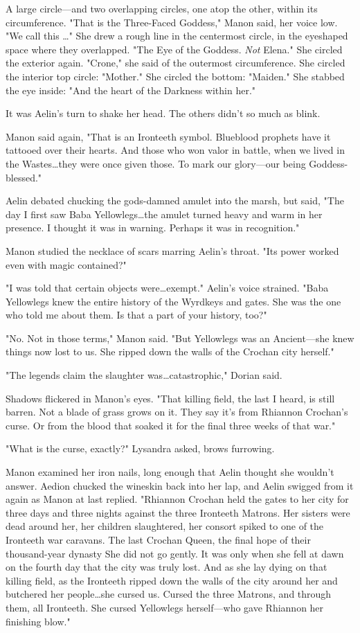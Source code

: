 A large circle---and two overlapping circles, one atop the other, within its circumference.
"That is the Three-Faced Goddess," Manon said, her voice low.
"We call this \ldots" She drew a rough line in the centermost circle, in the eyeshaped space where they overlapped.
"The Eye of the Goddess.
\emph{Not} Elena."
She circled the exterior again.
"Crone," she said of the outermost circumference.
She circled the interior top circle: "Mother."
She circled the bottom: "Maiden."
She stabbed the eye inside: "And the heart of the Darkness within her."

It was Aelin's turn to shake her head.
The others didn't so much as blink.

Manon said again, "That is an Ironteeth symbol.
Blueblood prophets have it tattooed over their hearts.
And those who won valor in battle, when we lived in the Wastes\ldots they were once given those.
To mark our glory---our being Goddess-blessed."

Aelin debated chucking the gods-damned amulet into the marsh, but said, "The day I first saw Baba Yellowlegs\ldots the amulet turned heavy and warm in her presence.
I thought it was in warning.
Perhaps it was in  recognition."

Manon studied the necklace of scars marring Aelin's throat.
"Its power worked even with magic contained?"

"I was told that certain objects were\ldots exempt."
Aelin's voice strained.
"Baba Yellowlegs knew the entire history of the Wyrdkeys and gates.
She was the one who told me about them.
Is that a part of your history, too?"

"No.
Not in those terms," Manon said.
"But Yellowlegs was an Ancient---she knew things now lost to us.
She ripped down the walls of the Crochan city herself."

"The legends claim the slaughter was\ldots catastrophic," Dorian said.

Shadows flickered in Manon's eyes.
"That killing field, the last I heard, is still barren.
Not a blade of grass grows on it.
They say it's from Rhiannon Crochan's curse.
Or from the blood that soaked it for the final three weeks of that war."

"What is the curse, exactly?"
Lysandra asked, brows furrowing.

Manon examined her iron nails, long enough that Aelin thought she wouldn't answer.
Aedion chucked the wineskin back into her lap, and Aelin swigged from it again as Manon at last replied.
"Rhiannon Crochan held the gates to her city for three days and three nights against the three Ironteeth Matrons.
Her sisters were dead around her, her children slaughtered, her consort spiked to one of the Ironteeth war caravans.
The last Crochan Queen, the final hope of their thousand-year dynasty  She did not go gently.
It was only when she fell at dawn on the fourth day that the city was truly lost.
And as she lay dying on that killing field, as the Ironteeth ripped down the walls of the city around her and butchered her people\ldots she cursed us.
Cursed the three Matrons, and through them, all Ironteeth.
She cursed Yellowlegs herself---who gave Rhiannon her finishing blow."

